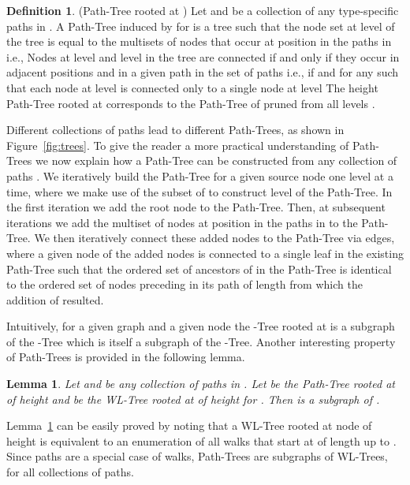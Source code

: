 \documentclass{article}
\theoremstyle{plain}
\newtheorem{lemma}[theorem]{Lemma}
\theoremstyle{definition}
\newtheorem{definition}[theorem]{Definition}
\theoremstyle{remark}
\begin{document}
\begin{definition}(Path-Tree rooted at )
\label{def1}
    Let  and  be a collection of any type-specific paths in .
    A Path-Tree  induced by  for  is a tree such that the node set at level  of the tree is equal to the multisets of nodes that occur at position  in the paths in  i.e., 
    Nodes at level  and level  in the tree are connected if and only if they occur in adjacent positions  and  in a given path in the set of paths  i.e.,  if  and  for any  such that each node at level  is connected only to a single node at level  
    The height  Path-Tree  rooted at  corresponds to the Path-Tree of  pruned from all levels .
 
\end{definition}
Different collections of paths lead to different Path-Trees, as shown in Figure~\ref{fig:trees}. 
To give the reader a more practical understanding of Path-Trees we now explain how a  Path-Tree can be constructed from any collection of paths .
We iteratively build the Path-Tree for a given source node  one level  at a time, where we make use of the subset  of  to construct level  of the Path-Tree. 
In the first iteration we add the root node  to the Path-Tree. 
Then, at subsequent iterations we add the multiset of nodes at position  in the paths in  to the Path-Tree.
We then iteratively connect these added nodes to the Path-Tree via edges, where a given node  of the added nodes is connected to a single leaf  in the existing Path-Tree such that the ordered set of ancestors of  in the Path-Tree is identical to the ordered set of nodes preceding  in its path of length  from which the addition of  resulted. 

Intuitively, for a given graph  and a given node  the -Tree rooted at  is a subgraph of the -Tree which is itself a subgraph of the -Tree.
Another interesting property of Path-Trees is provided in the following lemma. 
\begin{lemma}
\label{lemma1}
    Let  and  be any collection of paths in . Let  be the Path-Tree rooted at  of height  and  be the WL-Tree rooted at  of height  for . Then  is a subgraph of .  
\end{lemma}
Lemma~\ref{lemma1} can be easily proved by noting that a WL-Tree rooted at node  of height  is equivalent to an enumeration of all walks that start at  of length up to .
Since paths are a special case of walks, Path-Trees are subgraphs of WL-Trees, for all collections of paths. 
\end{document}
